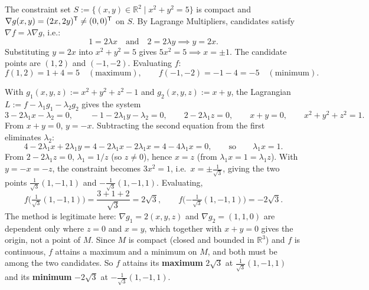 \begin{exercisesolution}
\label{sol:ai_lagrange_circle}
The constraint set $S := \{(x,y) \in \mathbb{R}^2 \mid x^2 + y^2 = 5\}$ is compact and $\nabla g(x,y) = (2x, 2y)^{\mathsf{T}} \neq (0,0)^{\mathsf{T}}$ on $S$. By Lagrange Multipliers, candidates satisfy $\nabla f = \lambda \nabla g$, i.e.:
\[
1 = 2\lambda x \quad \text{and} \quad 2 = 2\lambda y \implies y = 2x.
\]
Substituting $y = 2x$ into $x^2 + y^2 = 5$ gives $5x^2 = 5 \implies x = \pm 1$. The candidate points are $(1,2)$ and $(-1,-2)$. Evaluating $f$:
\[
f(1,2) = 1 + 4 = 5 \quad (\text{maximum}), \qquad f(-1,-2) = -1 - 4 = -5 \quad (\text{minimum}).
\]
\end{exercisesolution}

\begin{exercisesolution}
\label{sol:lagrange_sphere_plane}
With $g_1(x,y,z) := x^2+y^2+z^2-1$ and $g_2(x,y,z) := x+y$, the Lagrangian
$L := f - \lambda_1 g_1 - \lambda_2 g_2$ gives the system
\[3 - 2\lambda_1 x - \lambda_2 = 0, \qquad -1-2\lambda_1 y - \lambda_2 = 0, \qquad 2 - 2\lambda_1 z = 0, \qquad x+y=0, \qquad x^2+y^2+z^2=1.\]
From $x+y=0$, $y=-x$. Subtracting the second equation from the first eliminates $\lambda_2$:
\[4 - 2\lambda_1 x + 2\lambda_1 y = 4 - 2\lambda_1 x - 2\lambda_1 x = 4 - 4\lambda_1 x = 0,
  \qquad\text{so}\qquad \lambda_1 x = 1.\]
From $2-2\lambda_1 z=0$, $\lambda_1 = 1/z$ (so $z \neq 0$), hence $x = z$ (from $\lambda_1 x = 1 =
\lambda_1 z$). With $y=-x=-z$, the constraint becomes $3x^2 = 1$, i.e.\ $x = \pm\tfrac{1}{\sqrt3}$,
giving the two points $\tfrac{1}{\sqrt3}(1,-1,1)$ and $-\tfrac{1}{\sqrt3}(1,-1,1)$. Evaluating,
\[f\Big(\tfrac{1}{\sqrt3}(1,-1,1)\Big) = \frac{3+1+2}{\sqrt3} = 2\sqrt3, \qquad f\Big({-\tfrac{1}{\sqrt3}}(1,-1,1)\Big) = -2\sqrt3.\]
The method is legitimate here: $\nabla g_1 = 2(x,y,z)$ and $\nabla g_2 = (1,1,0)$ are dependent
only where $z = 0$ and $x = y$, which together with $x + y = 0$ gives the origin, not a point of
$M$. Since $M$ is compact (closed and bounded in $\mathbb{R}^3$) and $f$ is continuous, $f$
attains a maximum and a minimum on $M$, and both must be among the two candidates. So $f$ attains
its \textbf{maximum} $2\sqrt3$ at $\tfrac{1}{\sqrt3}(1,-1,1)$ and its \textbf{minimum} $-2\sqrt3$
at $-\tfrac{1}{\sqrt3}(1,-1,1)$.
\end{exercisesolution}

